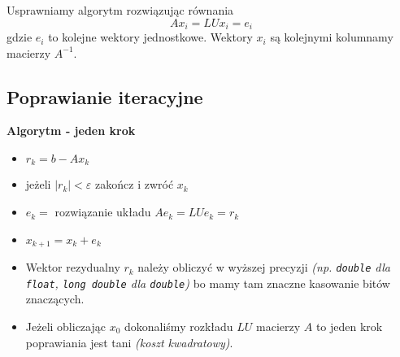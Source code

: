 \documentclass[../mn-notatki.tex]{subfiles}
\begin{document}
Usprawniamy algorytm rozwiązując równania
\[
Ax_i = LUx_i = e_i
\]
gdzie $e_i$ to kolejne wektory jednostkowe. Wektory $x_i$ są kolejnymi
kolumnamy macierzy $A^{-1}$.

\subsection{Poprawianie iteracyjne}

\begin{tcolorbox}
\textbf{Algorytm - jeden krok}
\begin{itemize}
    \item $r_k = b - Ax_k$
    \item jeżeli $|r_k| < \varepsilon$ zakończ i zwróć $x_k$
    \item $e_k = $ rozwiązanie układu $Ae_k = LUe_k = r_k$
    \item $x_{k+1} = x_k + e_k$
\end{itemize}
\end{tcolorbox}

\begin{itemize}
    \item Wektor rezydualny $r_k$ należy obliczyć w wyższej precyzji
    \textit{(np. \texttt{double} dla \texttt{float}, \texttt{long double} dla
    \texttt{double})} bo mamy tam znaczne kasowanie bitów znaczących.
    \item Jeżeli obliczając $x_0$ dokonaliśmy rozkładu $LU$ macierzy $A$ to
    jeden krok poprawiania jest tani \textit{(koszt kwadratowy)}.
\end{itemize}


\pagebreak
\end{document}
